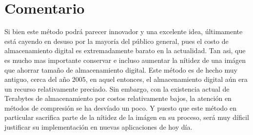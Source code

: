 \documentclass{article}
\begin{document}
\section{Comentario}
Si bien este método podrá parecer innovador y una excelente idea, 
últimamente está cayendo en desuso por la mayoría del público general,
pues el costo de almacenamiento digital es extremadamente barato 
en la actualidad. Tan asi, que es mucho mas importante conservar 
e incluso aumentar la nítidez de una imágen que ahorrar tamaño de 
almacenamiento digital. Este método es de hecho muy antiguo, cerca
del año 2005, en aquel entonces, el almacenamiento digital aún era
un recurso relativamente preciado. Sin embargo, con la existencia
actual de Terabytes de almacenamiento por costos relativamente bajos, 
la atención en métodos de compresión se ha desvíado un poco. Y puesto
que este método en particular sacrifica parte de la nítidez de la imágen
en su proceso, será muy díficil justificar su implementación en 
nuevas aplicaciones de hoy día.


\end{document}
